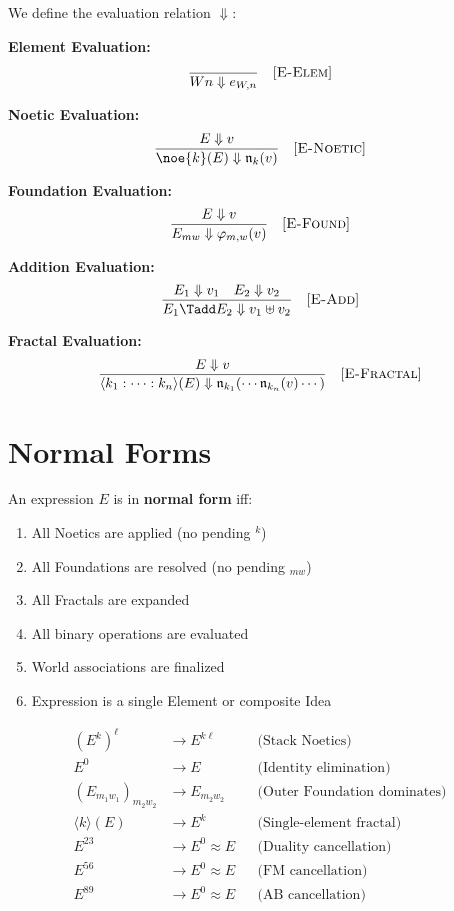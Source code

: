 \begin{definition}
\label{def:bigstep}
We define the evaluation relation $\Downarrow$:

\textbf{Element Evaluation:}
\[
\frac{}{Wn \Downarrow e_{W,n}} \quad [\textsc{E-Elem}]
\]

\textbf{Noetic Evaluation:}
\[
\frac{E \Downarrow v}{\noe{k}(E) \Downarrow \mathfrak{n}_k(v)} \quad [\textsc{E-Noetic}]
\]

\textbf{Foundation Evaluation:}
\[
\frac{E \Downarrow v}{E_{mw} \Downarrow \varphi_{m,w}(v)} \quad [\textsc{E-Found}]
\]

\textbf{Addition Evaluation:}
\[
\frac{E_1 \Downarrow v_1 \quad E_2 \Downarrow v_2}{E_1 \Tadd E_2 \Downarrow v_1 \uplus v_2} \quad [\textsc{E-Add}]
\]

\textbf{Fractal Evaluation:}
\[
\frac{E \Downarrow v}{\langle k_1 : \cdots : k_n \rangle(E) \Downarrow \mathfrak{n}_{k_1}(\cdots\mathfrak{n}_{k_n}(v)\cdots)} \quad [\textsc{E-Fractal}]
\]
\end{definition}

\section{Normal Forms}

\begin{definition}
\label{def:normal-form}
An expression $E$ is in \textbf{normal form} iff:
\begin{enumerate}
  \item All Noetics are applied (no pending ${}^k$)
  \item All Foundations are resolved (no pending ${}_{mw}$)
  \item All Fractals are expanded
  \item All binary operations are evaluated
  \item World associations are finalized
  \item Expression is a single Element or composite Idea
\end{enumerate}
\end{definition}

\begin{definition}
\label{def:norm-rules}
\begin{align}
(E^k)^\ell &\to E^{k\ell} && \text{(Stack Noetics)} \\
E^0 &\to E && \text{(Identity elimination)} \\
(E_{m_1 w_1})_{m_2 w_2} &\to E_{m_2 w_2} && \text{(Outer Foundation dominates)} \\
\langle k \rangle(E) &\to E^k && \text{(Single-element fractal)} \\
E^{23} &\to E^0 \approx E && \text{(Duality cancellation)} \\
E^{56} &\to E^0 \approx E && \text{(FM cancellation)} \\
E^{89} &\to E^0 \approx E && \text{(AB cancellation)}
\end{align}
\end{definition}

